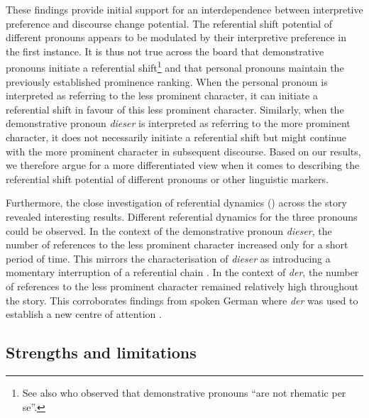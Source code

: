 \documentclass[output=paper,colorlinks,citecolor=brown]{langscibook}
\begin{document}
These findings provide initial support for an interdependence between interpretive preference and discourse change potential. The referential shift potential of different pronouns appears to be modulated by their interpretive preference in the first instance. It is thus not true across the board that demonstrative pronouns initiate a referential shift\footnote{See also \citet[73]{Weinert2011} who observed that demonstrative pronouns “are not rhematic per se”.} and that personal pronouns maintain the previously established prominence ranking. When the personal pronoun is interpreted as referring to the less prominent character, it can initiate a referential shift in favour of this less prominent character. Similarly, when the demonstrative pronoun \textit{dieser} is interpreted as referring to the more prominent character, it does not necessarily initiate a referential shift but might continue with the more prominent character in subsequent discourse. Based on our results, we therefore argue for a more differentiated view when it comes to describing the referential shift potential of different pronouns or other linguistic markers. 

Furthermore, the close investigation of referential dynamics () across the story revealed interesting results. Different referential dynamics for the three pronouns could be observed. In the context of the demonstrative pronoun \textit{dieser}, the number of references to the less prominent character increased only for a short period of time. This mirrors the characterisation of \textit{dieser} as introducing a momentary interruption of a referential chain \citep{Weinrich1993}. In the context of \textit{der}, the number of references to the less prominent character remained relatively high throughout the story. This corroborates findings from spoken German where \textit{der} was used to establish a new centre of attention \citep{Ahrenholz2007}. 

\subsection{Strengths and limitations}\label{sec:fuchs:3.3}
\end{document}
